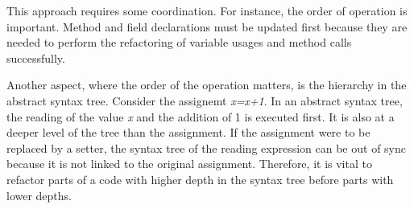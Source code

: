 This approach requires some coordination. For instance, the order of operation is important. Method and field declarations must be updated first because they are needed to perform the refactoring of variable usages and method calls successfully. 

Another aspect, where the order of the operation matters, is the hierarchy in the abstract syntax tree. Consider the assignemt \textit{x=x+1}. In an abstract syntax tree, the reading of the value \textit{x} and the addition of 1 is executed first. It is also at a deeper level of the tree than the assignment. If the assignment were to be replaced by a setter, the syntax tree of the reading expression can be out of sync because it is not linked to the original assignment. Therefore, it is vital to refactor parts of a code with higher depth in the syntax tree before parts with lower depths. 

\begin{comment}
\subsection{ChatGPT}
ChatGPT is another approach to detect data clumps as it can process code easily and report data clumps in any format the user wants. It also supports many programming languages that other tools do not provide.

However, ChatGPT has a limited context size, so processing large projects is  either too costly or simply not possible.

Giving ChatGPT the right instructions to find data clumps can also be challenging. While ChatGPT can define and find some data clumps without further context, it is better to give it a precise definition to work with. The following definition leads to good result, however it cannot be guaranteed that this will work forever:


A data clump exists
\begin{enumerate}
   
   \item if at least three fields also exists in another class
   \item if at least three fields also exists as method parameters in some method
    \item if two methods have at least three common parameters
\end{enumerate}
\end{comment}